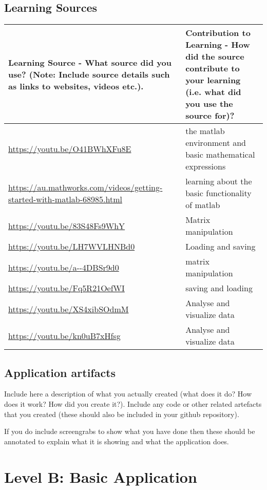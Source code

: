 \documentclass[a4paper, 11pt]{report}
\begin{document}
\subsection{Learning Sources}


\begin{tabular}{|p{}|p{}|}
	\hline
	Learning Source - What source did you use? (Note: Include source details such as links to websites, videos etc.). & Contribution to Learning - How did the source contribute to your learning (i.e. what did you use the source for)?\\
	\hline
	\url{https://youtu.be/O41BWhXFu8E} & the matlab environment and basic mathematical expressions\\
	\hline
	\url{https://au.mathworks.com/videos/getting-started-with-matlab-68985.html } & learning about the basic functionality of matlab\\
	\hline
	\url{https://youtu.be/83S48Fs9WhY} & Matrix manipulation \\
	\hline
	\url{https://youtu.be/LH7WVLHNBd0}  & Loading and saving\\
	\hline
	\url{https://youtu.be/a--4DBSr9d0} & matrix manipulation\\
	\hline
	\url{https://youtu.be/Fq5R21OefWI} & saving and loading\\
    \hline
    \url{https://youtu.be/XS4xibSOdmM} & Analyse and visualize data\\
    \hline
    \url{https://youtu.be/kn0uB7xHfsg } & Analyse and visualize data\\
    \hline
       
\end{tabular}

\subsection{Application artifacts}
Include here a description of what you actually created (what does it do? How does it work? How did you create it?). Include any code or other related artefacts that you created (these should also be included in your github repository).

If you do include screengrabs to show what you have done then these should be annotated to explain what it is showing and what the application does.



\newpage
\section{Level B: Basic Application}
\end{document}
